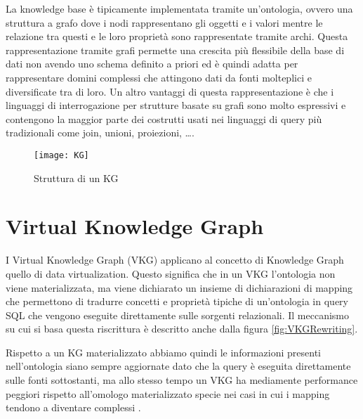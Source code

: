 La knowledge base è tipicamente implementata tramite un'ontologia, ovvero una struttura a grafo dove i nodi rappresentano gli oggetti e i valori mentre le relazione tra questi 
e le loro proprietà sono rappresentate tramite archi. Questa rappresentazione tramite grafi permette una crescita più flessibile della base di dati non avendo uno schema definito a priori ed è quindi adatta
per rappresentare domini complessi che attingono dati da fonti molteplici e diversificate tra di loro. Un altro vantaggi di questa rappresentazione è che i linguaggi di interrogazione per strutture basate su grafi 
sono molto espressivi e contengono la maggior parte dei costrutti usati nei linguaggi di query più tradizionali come join, unioni, proiezioni, \dots \cite{KGIntro}.


\begin{figure}[ht]
    \centering
    \texttt{[image: KG]}
    \caption{Struttura di un KG}
    \label{fig:KG}
\end{figure}


\section{Virtual Knowledge Graph}
\label{sec:vkg_description}
I Virtual Knowledge Graph (VKG) applicano al concetto di Knowledge Graph quello di data virtualization. Questo significa che in un VKG l'ontologia non viene materializzata, ma viene dichiarato un insieme di dichiarazioni 
di mapping che permettono di tradurre concetti e proprietà tipiche di un'ontologia in query SQL che vengono eseguite direttamente sulle sorgenti relazionali. Il meccanismo su cui si basa questa riscrittura è descritto 
anche dalla figura \ref{fig:VKGRewriting}.

Rispetto a un KG materializzato abbiamo quindi le informazioni presenti nell'ontologia siano sempre aggiornate dato che la query è eseguita direttamente sulle fonti sottostanti, ma allo stesso tempo un VKG ha mediamente 
performance peggiori rispetto all'omologo materializzato specie nei casi in cui i mapping tendono a diventare complessi \cite{VKGMedical}.

